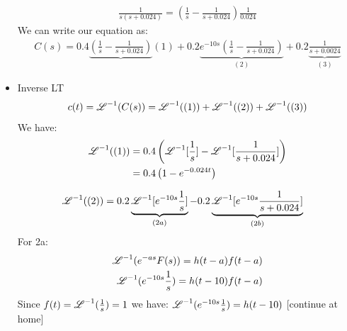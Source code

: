 \begin{exmp}{}
\begin{itemize}
\begin{align*}
\frac{1}{s(s+0.024)}=\left(\frac{1}{s}-\frac{1}{s+0.024}\right)\frac{1}{0.024}
 \end{align*}
We can write our equation as:
  \begin{align*}
C(s)=0.4\underbrace{\left(\frac{1}{s}-\frac{1}{s+0.024}\right)}_{}(1)+0.2\underbrace{e^{-10s}\left(\frac{1}{s}-\frac{1}{s+0.024}\right)}_{(2)}+0.2\underbrace{\frac{1}{s+0.0024}}_{(3)}
 \end{align*}
 \item Inverse LT\\
 \begin{align*}
 c(t)=\operatorname{\mathscr{L}}^{-1}(C(s))=\operatorname{\mathscr{L}}^{-1}((1))+\operatorname{\mathscr{L}}^{-1}((2))+\operatorname{\mathscr{L}}^{-1}((3))
 \end{align*}
 We have:
 \begin{align*}
\operatorname{\mathscr{L}}^{-1}((1))&=0.4\left(\operatorname{\mathscr{L}}^{-1}[\frac{1}{s}]-\operatorname{\mathscr{L}}^{-1}[\frac{1}{s+0.024}]\right)\\
&=0.4\left(1-e^{-0.024t}\right)
 \end{align*}

 \begin{align*}
\operatorname{\mathscr{L}}^{-1}((2))&=0.2\underbrace{\operatorname{\mathscr{L}}^{-1}[e^{-10s}\frac{1}{s}]}_{(2a)}  -0.2\underbrace{\operatorname{\mathscr{L}}^{-1}[e^{-10s}\frac{1}{s+0.024}]}_{(2b)}
 \end{align*} 
 For 2a:
  \begin{align*}
\operatorname{\mathscr{L}}^{-1}(e^{-as}F(s))=h(t-a)f(t-a)\\
\operatorname{\mathscr{L}}^{-1}(e^{-10s}\frac{1}{s})=h(t-10)f(t-a)\\
 \end{align*} 
 Since $f(t)=\operatorname{\mathscr{L}}^{-1}(\frac{1}{s})=1$ we have: $\operatorname{\mathscr{L}}^{-1}(e^{-10s}\frac{1}{s})=h(t-10)$
 [continue at home]
\end{itemize}
\end{exmp}
